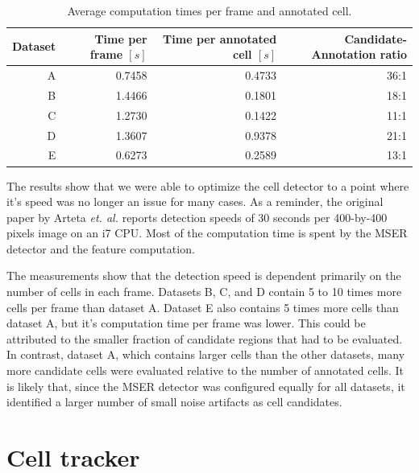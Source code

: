 		\begin{table}[h]
			\centering
			\begin{tabular}{rrrr}
				Dataset & Time per frame  $\left[ s \right]$ & Time per annotated cell  $\left[ s \right]$ & Candidate-Annotation ratio \\
			\hline
				      A &                             0.7458 &                                      0.4733 &                       36:1 \\
				      B &                             1.4466 &                                      0.1801 &                       18:1 \\
				      C &                             1.2730 &                                      0.1422 &                       11:1 \\
				      D &                             1.3607 &                                      0.9378 &                       21:1 \\
				      E &                             0.6273 &                                      0.2589 &                       13:1
			\end{tabular} 
			\caption{Average computation times per frame and annotated cell.}
			\label{tab:results_detector_speed}
		\end{table}

		The results show that we were able to optimize the cell detector to a point where it's speed was no longer an issue for many cases. As a reminder, the original paper by Arteta \emph{et. al.} \cite{arteta12} reports detection speeds of 30 seconds per 400-by-400 pixels image on an i7 CPU. Most of the computation time is spent by the MSER detector and the feature computation.
		
		The measurements show that the detection speed is dependent primarily on the number of cells in each frame. Datasets B, C, and D contain 5 to 10 times more cells per frame than dataset A. Dataset E also contains 5 times more cells than dataset A, but it's computation time per frame was lower. This could be attributed to the smaller fraction of candidate regions that had to be evaluated. In contrast, dataset A, which contains larger cells than the other datasets, many more candidate cells were evaluated relative to the number of annotated cells. It is likely that, since the MSER detector was configured equally for all datasets, it identified a larger number of small noise artifacts as cell candidates.
		
\section{Cell tracker}
	\label{sec:results_tracker}
	
